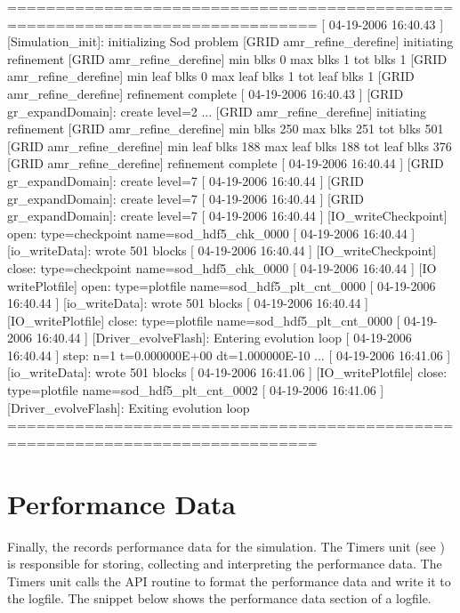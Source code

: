\begin{codeseg}
 ==============================================================================
 [ 04-19-2006  16:40.43 ] [Simulation_init]: initializing Sod problem
 [GRID amr_refine_derefine]             initiating refinement
 [GRID amr_refine_derefine] min blks 0    max blks 1    tot blks 1
 [GRID amr_refine_derefine] min leaf blks 0    max leaf blks 1    tot leaf blks 1
 [GRID amr_refine_derefine]             refinement complete
 [ 04-19-2006  16:40.43 ] [GRID gr_expandDomain]: create level=2
 ...
 [GRID amr_refine_derefine]             initiating refinement
 [GRID amr_refine_derefine] min blks 250    max blks 251    tot blks 501
 [GRID amr_refine_derefine] min leaf blks 188    max leaf blks 188    tot leaf blks 376
 [GRID amr_refine_derefine]             refinement complete
 [ 04-19-2006  16:40.44 ] [GRID gr_expandDomain]: create level=7
 [ 04-19-2006  16:40.44 ] [GRID gr_expandDomain]: create level=7
 [ 04-19-2006  16:40.44 ] [GRID gr_expandDomain]: create level=7
 [ 04-19-2006  16:40.44 ] [IO_writeCheckpoint] open: type=checkpoint name=sod_hdf5_chk_0000
 [ 04-19-2006  16:40.44 ] [io_writeData]: wrote     501          blocks
 [ 04-19-2006  16:40.44 ] [IO_writeCheckpoint] close: type=checkpoint name=sod_hdf5_chk_0000
 [ 04-19-2006  16:40.44 ] [IO writePlotfile] open: type=plotfile name=sod_hdf5_plt_cnt_0000
 [ 04-19-2006  16:40.44 ] [io_writeData]: wrote     501          blocks
 [ 04-19-2006  16:40.44 ] [IO_writePlotfile] close: type=plotfile name=sod_hdf5_plt_cnt_0000
 [ 04-19-2006  16:40.44 ] [Driver_evolveFlash]: Entering evolution loop
 [ 04-19-2006  16:40.44 ] step: n=1 t=0.000000E+00 dt=1.000000E-10
 ...
 [ 04-19-2006  16:41.06 ] [io_writeData]: wrote     501          blocks
 [ 04-19-2006  16:41.06 ] [IO_writePlotfile] close: type=plotfile name=sod_hdf5_plt_cnt_0002
 [ 04-19-2006  16:41.06 ] [Driver_evolveFlash]: Exiting evolution loop
 ==============================================================================
\end{codeseg}

\section{Performance Data}
\label{Sec:LogfilePerformance}
Finally, the  records performance data for the
simulation.  The \unit{Timers} unit (see ) is
responsible for storing, collecting and interpreting the performance
data.  The \unit{Timers} unit calls the API routine
 to format the performance data and
write it to the logfile.  The snippet below shows the
performance data section of a logfile.

